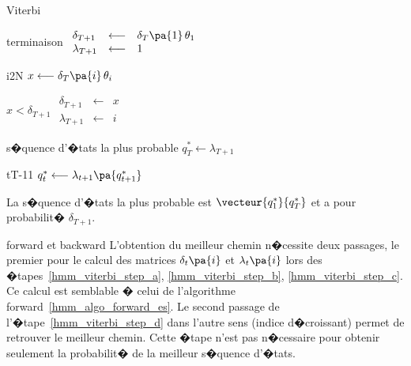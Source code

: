 \begin{xalgorithm}{Viterbi}
        \begin{xalgostep}{terminaison}\label{hmm_viterbi_step_c}
                $
                \begin{array}{lll}
                \delta_{T+1}        &\longleftarrow& \delta_{T}\pa{1} \, \theta_{1} \\
                \lambda_{T+1}       &\longleftarrow& 1
                \end{array}
                $ \\
                \begin{xfor}{i}{2}{N}
                        $x \longleftarrow \delta_{T}\pa{i} \, \theta_i$ \\
                        \begin{xif}{$x < \delta_{T+1}$}
                                $
                                \begin{array}{lll}
                                \delta_{T+1}  &\longleftarrow& x \\
                                \lambda_{T+1} &\longleftarrow& i
                                \end{array}
                                $
                        \end{xif}
                \end{xfor}
        \end{xalgostep}
        
        \begin{xalgostep}{s�quence d'�tats la plus probable}\label{hmm_viterbi_step_d}
                $q^*_T  \longleftarrow \lambda_{T+1}$ \\
                \begin{xfor}{t}{T-1}{1}
                        $q^*_t  \longleftarrow \lambda_{t+1}\pa{ q^*_{t+1}}$
                \end{xfor}
        \end{xalgostep}
        
        La s�quence d'�tats la plus probable est $\vecteur{q^*_1}{q^*_T}$ et a pour probabilit� $\delta_{T+1}$.
        
        \end{xalgorithm}
        




\begin{xremark}{forward et backward}
L'obtention du meilleur chemin n�cessite deux passages, le premier pour le calcul des matrices $\delta_t\pa{i}$ et $\lambda_t\pa{i}$   lors des �tapes~\ref{hmm_viterbi_step_a}, \ref{hmm_viterbi_step_b}, \ref{hmm_viterbi_step_c}. Ce calcul est semblable � celui de l'algorithme forward~\ref{hmm_algo_forward_es}. Le second passage de l'�tape~\ref{hmm_viterbi_step_d} dans l'autre sens (indice d�croissant) permet de retrouver le meilleur chemin. Cette �tape n'est pas n�cessaire pour obtenir seulement la probabilit� de la meilleur s�quence d'�tats.
\end{xremark}




